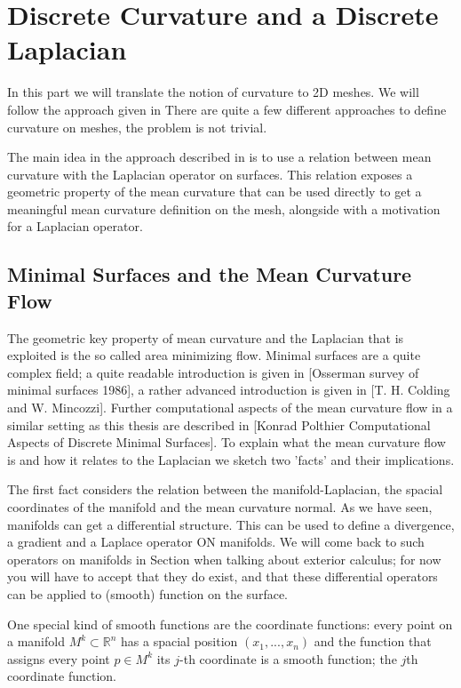 
\section{Discrete Curvature and a Discrete Laplacian}
In this part we will translate the notion of curvature to 2D meshes. We will follow the approach given in  There are quite a few different approaches to define curvature on meshes, the problem is not trivial. 


The main idea in the approach described in  is to use a relation between mean curvature with the Laplacian operator on surfaces. This relation exposes a geometric property of the mean curvature that can be  used directly to get a meaningful mean curvature definition on the mesh, alongside with a motivation for a Laplacian operator.

\subsection{Minimal Surfaces and the Mean Curvature Flow}
The geometric key property of mean curvature and the Laplacian that is exploited is the so called area minimizing flow. Minimal surfaces are a quite complex field; a quite readable introduction is given in [Osserman survey of minimal surfaces 1986], a rather advanced introduction is given in [T. H. Colding and W. Mincozzi]. Further computational aspects of the mean curvature flow in a similar setting as this thesis are described in [Konrad Polthier Computational Aspects of Discrete Minimal Surfaces]. To explain what the mean curvature flow is and how it relates to the Laplacian we sketch two 'facts' and their implications.

The first fact considers the relation between the manifold-Laplacian, the spacial coordinates of the manifold and the mean curvature normal. As we have seen, manifolds can get a differential structure. This can be used to define a divergence, a gradient and a Laplace operator ON manifolds. We will come back to such operators on manifolds in Section  when talking about exterior calculus; for now you will have to accept that they do exist, and that these differential operators can be applied to (smooth) function on the surface. 

 One special kind of smooth functions are the coordinate functions: every point on a manifold $M^k \subset \mathbb R^n$ has a spacial position $(x_1,...,x_n)$ and the function that assigns every point $p\in M^k$ its $j$-th coordinate is a smooth function; the $j$th coordinate function. 

